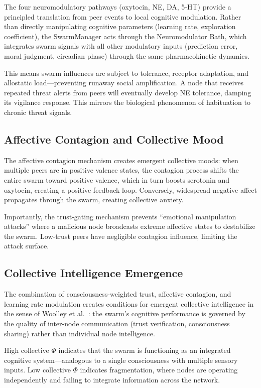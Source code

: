 \documentclass[11pt,a4paper]{article}
\begin{document}
The four neuromodulatory pathways (oxytocin, NE, DA, 5-HT) provide a principled translation from peer events to local cognitive modulation. Rather than directly manipulating cognitive parameters (learning rate, exploration coefficient), the SwarmManager acts through the Neuromodulator Bath, which integrates swarm signals with all other modulatory inputs (prediction error, moral judgment, circadian phase) through the same pharmacokinetic dynamics.

This means swarm influences are subject to tolerance, receptor adaptation, and allostatic load---preventing runaway social amplification. A node that receives repeated threat alerts from peers will eventually develop NE tolerance, damping its vigilance response. This mirrors the biological phenomenon of habituation to chronic threat signals.

\subsection{Affective Contagion and Collective Mood}

The affective contagion mechanism creates emergent collective moods: when multiple peers are in positive valence states, the contagion process shifts the entire swarm toward positive valence, which in turn boosts serotonin and oxytocin, creating a positive feedback loop. Conversely, widespread negative affect propagates through the swarm, creating collective anxiety.

Importantly, the trust-gating mechanism prevents ``emotional manipulation attacks'' where a malicious node broadcasts extreme affective states to destabilize the swarm. Low-trust peers have negligible contagion influence, limiting the attack surface.

\subsection{Collective Intelligence Emergence}

The combination of consciousness-weighted trust, affective contagion, and learning rate modulation creates conditions for emergent collective intelligence in the sense of Woolley et al.\ \citep{woolley2010}: the swarm's cognitive performance is governed by the quality of inter-node communication (trust verification, consciousness sharing) rather than individual node intelligence.

High collective $\Phi$ indicates that the swarm is functioning as an integrated cognitive system---analogous to a single consciousness with multiple sensory inputs. Low collective $\Phi$ indicates fragmentation, where nodes are operating independently and failing to integrate information across the network.
\end{document}
